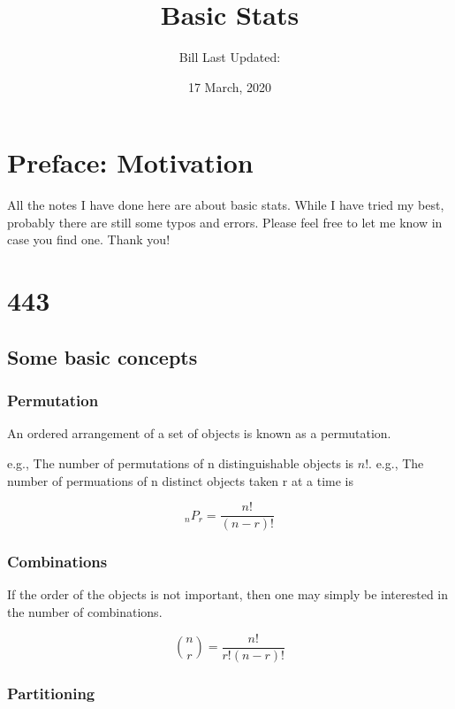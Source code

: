 \documentclass[
]{book}
\title{Basic Stats}
\author{Bill Last Updated:}
\date{17 March, 2020}
\begin{document}
\frontmatter
\maketitle

{
\setcounter{tocdepth}{1}
\tableofcontents
}
\mainmatter
\hypertarget{my-section}{%
\chapter*{Preface: Motivation}\label{my-section}}

All the notes I have done here are about basic stats. While I have tried my best, probably there are still some typos and errors. Please feel free to let me know in case you find one. Thank you!

\hypertarget{section}{%
\chapter{443}\label{section}}

\hypertarget{some-basic-concepts}{%
\section{Some basic concepts}\label{some-basic-concepts}}

\hypertarget{permutation}{%
\subsection{Permutation}\label{permutation}}

An ordered arrangement of a set of objects is known as a permutation.

e.g., The number of permutations of n distinguishable objects is \(n!\).
e.g., The number of permuations of n distinct objects taken r at a time is

\[_{n}P_r=\frac{n!}{(n-r)!}\]

\hypertarget{combinations}{%
\subsection{Combinations}\label{combinations}}

If the order of the objects is not important, then one may simply be interested in the number of combinations.

\[\binom{n}{r}=\frac{n!}{r!(n-r)!}\]

\hypertarget{partitioning}{%
\subsection{Partitioning}\label{partitioning}}
\end{document}
